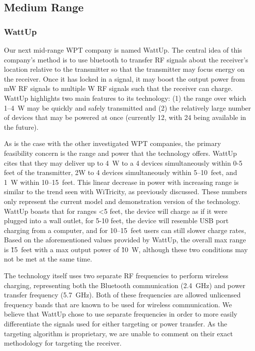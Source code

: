\subsection{Medium Range}

\subsubsection{WattUp}
Our next mid-range WPT company is named WattUp. The central idea of this company’s method is to use bluetooth to transfer RF signals about the receiver’s location relative to the transmitter so that the transmitter may focus energy on the receiver. Once it has locked in a signal, it may boost the output power from mW RF signals to multiple W RF signals such that the receiver can charge. WattUp highlights two main features to its technology: (1) the range over which \numrange{1}{4}~W may be quickly and safely transmitted and (2) the relatively large number of devices that may be powered at once (currently 12, with 24 being available in the future).

As is the case with the other investigated WPT companies, the primary feasibility concern is the range and power that the technology offers. WattUp cites that they may deliver up to 4~W to a 4 devices simultaneously within 0-5 feet of the transmitter, 2W to 4 devices simultaneously within \numrange{5}{10}~feet, and 1~W within \numrange{10}{15}~feet. This linear decrease in power with increasing range is similar to the trend seen with WiTricity, as previously discussed. These numbers only represent the current model and demonstration version of the technology. WattUp boasts that for ranges <5 feet, the device will charge as if it were plugged into a wall outlet, for 5-10 feet, the device will resemble USB port charging from a computer, and for \numrange{10}{15}~feet users can still slower charge rates, Based on the aforementioned values provided by WattUp, the overall max range is \~15~feet with a max output power of \~10~W, although these two conditions may not be met at the same time.

The technology itself uses two separate RF frequencies to perform wireless charging, representing both the Bluetooth communication (2.4~GHz) and power transfer frequency (5.7~GHz). Both of these frequencies are allowed unlicensed frequency bands that are known to be used for wireless communication. We believe that WattUp chose to use separate frequencies in order to more easily differentiate the signals used for either targeting or power transfer. As the targeting algorithm is proprietary, we are unable to comment on their exact methodology for targeting the receiver.

